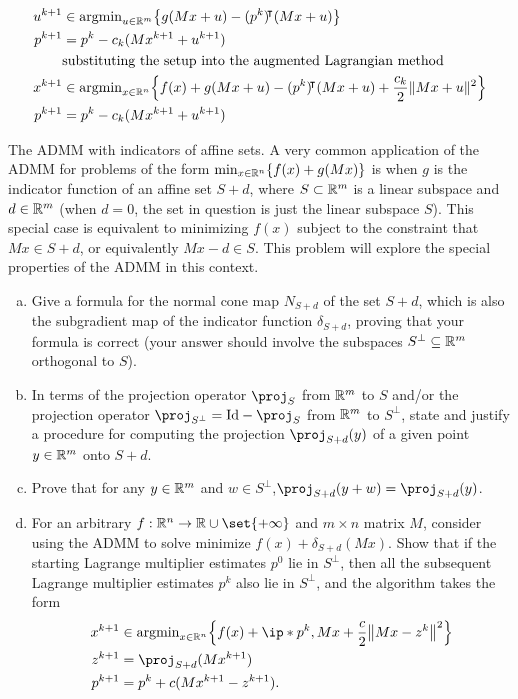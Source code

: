 \documentclass{article}
\begin{document}
\begin{solution}
\begin{enumerate}[(a)]
{\begin{align*}
                u^{k+1} &\in \argmin_{u\in\R^m}\braces*{g(Mx+u)-(p^k)\trn (Mx+u)} \\
                p^{k+1} &= p^k-c_k(Mx^{k+1}+u^{k+1}) \\
                &\text{substituting the setup into the augmented Lagrangian method} \\
                x^{k+1} &\in \argmin_{x\in\R^n}\braces*{f(x)+g(Mx+u)-(p^k)\trn (Mx+u)+\frac{c_k}{2}\norm{Mx+u}^2} \\
                p^{k+1} &= p^k-c_k(Mx^{k+1}+u^{k+1}) 
            \end{align*}
        }
    \end{enumerate}
\end{solution}

\begin{problem}
    {The ADMM with indicators of affine sets.}
    A very common application of the ADMM for problems of the form $\min_{x\in\mathbb{R}^n}\lbrace f(x)+g(Mx)\rbrace$ is when $g$ is the indicator function of an affine set $S+d$, where $S\subset\mathbb{R}^m$ is a linear subspace and $d\in\mathbb{R}^m$ (when $d=0$, the set in question is just the linear subspace $S$). This special case is equivalent to minimizing $f(x)$ subject to the constraint that $Mx\in S+d$, or equivalently $Mx-d\in S$. This problem will explore the special properties of the ADMM in this context.
    \begin{enumerate}[(a)]
        \item Give a formula for the normal cone map $N_{S+d}$ of the set $S+d$, which is also the subgradient map of the indicator function $\delta_{S+d}$, proving that your formula is correct (your answer should involve the subspaces $S^{\bot}\subseteq\mathbb{R}^m$ orthogonal to $S$).
        \item In terms of the projection operator $\proj_S$ from $\mathbb{R}^m$ to $S$ and/or the projection operator $\proj_{S^{\bot}}=\mathrm{Id}-\proj_S$ from $\mathbb{R}^m$ to $S^{\bot}$, state and justify a procedure for computing the projection $\proj_{S+d}(y)$ of a given point $y\in\mathbb{R}^m$ onto $S+d$.
        \item Prove that for any $y\in\mathbb{R}^m$ and $w\in S^{\bot}$,$\proj_{S+d}(y+w)=\proj_{S+d}(y)$.
        \item For an arbitrary $f:\R^n\rightarrow\R\cup\set{+\infty}$ and $m\times n$ matrix $M$, consider using the ADMM to solve minimize $f(x)+\delta_{S+d}(Mx)$. Show that if the starting Lagrange multiplier estimates $p^0$ lie in $S^{\bot}$, then all the subsequent Lagrange multiplier estimates $p^k$ also lie in $S^{\bot}$, and the algorithm takes the form
        \begin{align*}
            x^{k+1} &\in \argmin_{x\in\R^n}\braces*{f(x)+\ip*{p^k,Mx}+\frac{c}{2}\norm*{Mx-z^k}^2} \\
            z^{k+1} &= \proj_{S+d}(Mx^{k+1}) \\
            p^{k+1} &= p^k+c(Mx^{k+1}-z^{k+1}).
        \end{align*}
    \end{enumerate}
\end{problem}
\end{document}
